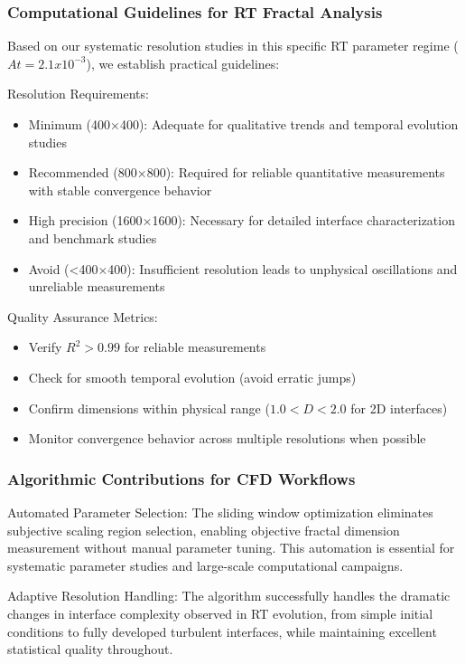 \documentclass[preprint,12pt]{elsarticle}
\def\textbf#1{#1}%
\def\times{x}%
\begin{document}
\subsubsection{Computational Guidelines for RT Fractal Analysis}

Based on our systematic resolution studies in this specific RT parameter regime ($At = 2.1 \times 10^{-3}$), we establish practical guidelines:

\textbf{Resolution Requirements}:
\begin{itemize}
\item \textbf{Minimum (400×400)}: Adequate for qualitative trends and temporal evolution studies
\item \textbf{Recommended (800×800)}: Required for reliable quantitative measurements with stable convergence behavior
\item \textbf{High precision (1600×1600)}: Necessary for detailed interface characterization and benchmark studies
\item \textbf{Avoid (<400×400)}: Insufficient resolution leads to unphysical oscillations and unreliable measurements
\end{itemize}

\textbf{Quality Assurance Metrics}:
\begin{itemize}
\item Verify $R^2 > 0.99$ for reliable measurements
\item Check for smooth temporal evolution (avoid erratic jumps)
\item Confirm dimensions within physical range ($1.0 < D < 2.0$ for 2D interfaces)
\item Monitor convergence behavior across multiple resolutions when possible
\end{itemize}

\subsubsection{Algorithmic Contributions for CFD Workflows}

\textbf{Automated Parameter Selection}: The sliding window optimization eliminates subjective scaling region selection, enabling objective fractal dimension measurement without manual parameter tuning. This automation is essential for systematic parameter studies and large-scale computational campaigns.

\textbf{Adaptive Resolution Handling}: The algorithm successfully handles the dramatic changes in interface complexity observed in RT evolution, from simple initial conditions to fully developed turbulent interfaces, while maintaining excellent statistical quality throughout.
\end{document}
